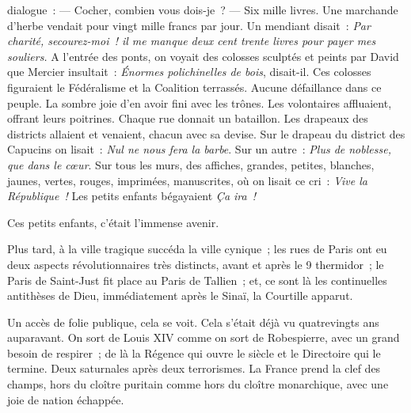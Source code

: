 \documentclass[french,twoside]{book} %
\begin{document}
dialogue : — Cocher, combien vous dois-je ? — Six mille livres. Une marchande d’herbe vendait pour vingt mille francs par jour. Un mendiant disait : \emph{Par charité, secourez-moi ! il me manque deux cent trente livres pour payer mes souliers.} A l’entrée des ponts, on voyait des colosses sculptés et peints par David que Mercier insultait : \emph{Énormes polichinelles de bois}, disait-il. Ces colosses figuraient le Fédéralisme et la Coalition terrassés. Aucune défaillance dans ce peuple. La sombre joie d’en avoir fini avec les trônes. Les volontaires affluaient, offrant leurs poitrines. Chaque rue donnait un bataillon. Les drapeaux des districts allaient et venaient, chacun avec sa devise. Sur le drapeau du district des Capucins on lisait : \emph{Nul ne nous fera la barbe}. Sur un autre : \emph{Plus de noblesse, que dans le cœur}. Sur tous les murs, des affiches, grandes,  petites, blanches, jaunes, vertes, rouges, imprimées, manuscrites, où on lisait ce cri : \emph{Vive la République !} Les petits enfants bégayaient \emph{Ça ira !}\par
Ces petits enfants, c’était l’immense avenir.\par
Plus tard, à la ville tragique succéda la ville cynique ; les rues de Paris ont eu deux aspects révolutionnaires très distincts, avant et après le 9 thermidor ; le Paris de Saint-Just fit place au Paris de Tallien ; et, ce sont là les continuelles antithèses de Dieu, immédiatement après le Sinaï, la Courtille apparut.\par
Un accès de folie publique, cela se voit. Cela s’était déjà vu quatrevingts ans auparavant. On sort de Louis XIV comme on sort de Robespierre, avec un grand besoin de respirer ; de là la Régence qui ouvre le siècle et le Directoire qui le termine. Deux saturnales après deux terrorismes. La France prend la clef des champs, hors du cloître puritain comme hors du cloître monarchique, avec une joie de nation échappée.\par
\end{document}
